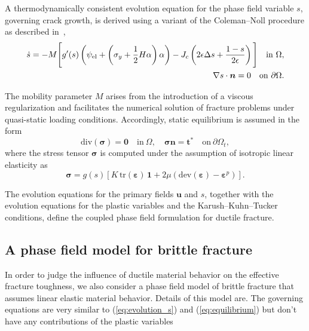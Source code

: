 \documentclass[pdflatex,sn-mathphys-num]{sn-jnl}%
\theoremstyle{thmstyleone}%
\theoremstyle{thmstyletwo}%
\theoremstyle{thmstylethree}%
\begin{document}
A thermodynamically consistent evolution equation for the phase field variable $s$, governing crack growth, is derived using a variant of the Coleman--Noll procedure as described in~\cite{noll_3d_2020},
\begin{align}
    \begin{split}
    \dot{s} = -M \Bigg[
    g'(s)\left(\psi_{\rm{el}} + \left(\sigma_y+\dfrac{1}{2}H\alpha\right)\alpha\right)
    - J_c\left(2\epsilon\Delta{s} + \dfrac{1-s}{2\epsilon}\right)
    \Bigg]
    \quad \text{in} \ \Omega, \\
    \nabla{s}\cdot{\boldsymbol{n}} = 0 \quad \text{on} \ \partial\Omega.
    \label{eq:evolution_s}
    \end{split}
\end{align}

The mobility parameter $M$ arises from the introduction of a viscous regularization and facilitates the numerical solution of fracture problems under quasi-static loading conditions. 
Accordingly, static equilibrium is assumed in the form
\begin{equation}
    \text{div}(\boldsymbol{\sigma}) = \boldsymbol{0} \quad \text{in} \ \Omega, 
    \quad 
    \boldsymbol{\sigma}\boldsymbol{n} = \boldsymbol{t}^* 
    \quad \text{on} \ \partial\Omega_t,
    \label{eq:equilibrium}
\end{equation}
where the stress tensor $\boldsymbol{\sigma}$ is computed under the assumption of isotropic linear elasticity as
\begin{equation}
    \boldsymbol{\sigma} = g(s)\left[
    K\,\text{tr}(\boldsymbol{\varepsilon})\,\boldsymbol{1}
    + 2\mu\left(\text{dev}(\boldsymbol{\varepsilon}) - \boldsymbol{\varepsilon}^p\right)
    \right].
    \label{eq:sigma_plast}
\end{equation}

The evolution equations for the primary fields $\boldsymbol{u}$ and $s$, together with the evolution equations for the plastic variables and the Karush--Kuhn--Tucker conditions, define the coupled phase field formulation for ductile fracture.


\subsection{A phase field model for brittle fracture}
\label{sec:phasefield_elastic}

In order to judge the influence of ductile material behavior on the effective fracture toughness, 
we also consider a phase field model of brittle fracture that assumes linear elastic material behavior. 
Details of this model are. The governing equations 
are very similar to (\ref{eq:evolution_s}) and (\ref{eq:equilibrium}) but don't have
any contributions of the plastic variables  
\end{document}
